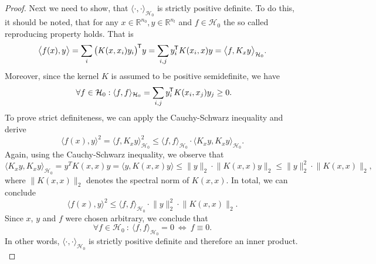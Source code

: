 \documentclass[11pt, a4paper]{article}
\newcommand{\R}{\mathbb{R}}
\renewcommand{\H}{\mathcal{H}}
\newcommand*{\tr}{^{\mkern-1.5mu\mathsf{T}}}
\begin{document}
\begin{proof}
Next we need to show, that $\langle \cdot, \cdot \rangle_{\H_0}$ is strictly positive definite. To do this, it should be noted, that for any $x \in \R^{n_0}, y \in \R^{n_l}$ and $f \in \H_0$ the so called reproducing property holds. That is
\[ \big \langle f(x), y \big \rangle = \sum_{i} \big ( K(x,x_i)y_i \big ) \tr y = \sum_{i,j} y_i \tr K(x_i,x)y = \big \langle f, K_xy \big \rangle_{\H_0}. \]
Moreover, since the kernel $K$ is assumed to be positive semidefinite, we have
\[ \forall f \in \H_0 : \langle f,f \rangle_{\H_0} = \sum_{i,j} y_i \tr K(x_i, x_j) y_j \geq 0. \]
To prove strict definiteness, we can apply the Cauchy-Schwarz inequality and derive
\[ \big \langle f(x), y \big \rangle^2 = \big \langle f, K_xy \big \rangle_{\H_0}^2 \leq \big \langle f , f \big \rangle_{\H_0} \cdot \big \langle K_xy , K_xy \big \rangle_{\H_0}. \]
Again, using the Cauchy-Schwarz inequality, we observe that 
\[ \big \langle K_xy, K_xy \big \rangle_{\H_0} = y^TK(x,x)y = \big \langle y, K(x,x)y \big \rangle \leq \big \| y \big \|_2 \cdot \big \| K(x,x)y \big \|_2 \leq \big \| y \big \|_2^2 \cdot \big \| K(x,x) \big \|_2, \]
where $\big \| K(x,x) \big \|_2$ denotes the spectral norm of $K(x,x)$. In total, we can conclude
\[ \big \langle f(x), y \big \rangle^2 \leq \big \langle f , f \big \rangle_{\H_0} \cdot \big \| y \big \|_2^2 \cdot \big \| K(x,x) \big \|_2. \]
Since $x$, $y$ and $f$ were chosen arbitrary, we conclude that 
\[ \forall f \in \H_0 \ : \ \langle f , f \rangle_{\H_0} = 0 \ \Leftrightarrow \ f \equiv 0. \]
In other words, $\langle \cdot, \cdot \rangle_{\H_0}$ is strictly positive definite and therefore an inner product. \\


\end{proof}
\end{document}
